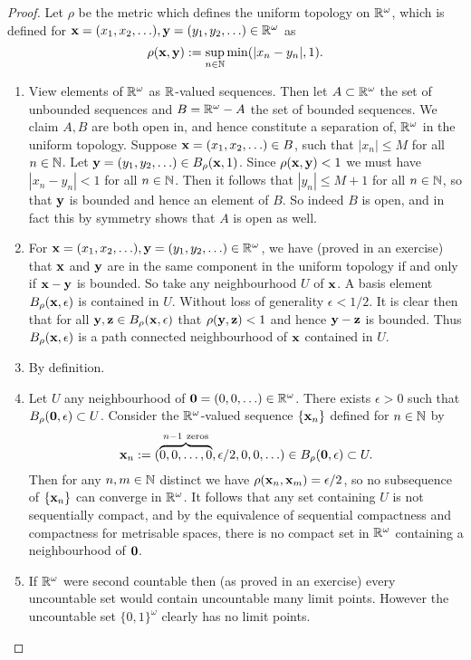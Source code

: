 \begin{proof}
  Let $\rho$ be the metric which defines the uniform topology on $\mathbb{R}^\omega$, which is defined for $\boldsymbol{\mathbf{x}} = (x_1,x_2,\ldots), \boldsymbol{\mathbf{y}} = (y_1,y_2,\ldots) \in \mathbb{R}^\omega$ as
\[ \rho(\boldsymbol{\mathbf{x}}, \boldsymbol{\mathbf{y}}) := \sup_{n \in \mathbb{N}} \min(|x_n - y_n|, 1). \]
  \begin{enumerate}[leftmargin=*]
  \item View elements of $\mathbb{R}^\omega$ as $\mathbb{R}$-valued sequences. Then let $A \subset \mathbb{R}^\omega$ the set of unbounded sequences and $B = \mathbb{R}^\omega - A$ the set of bounded sequences. We claim $A,B$ are both open in, and hence constitute a separation of, $\mathbb{R}^\omega$ in the uniform topology. Suppose $\boldsymbol{\mathbf{x}} = (x_1,x_2,\ldots) \in B$, such that $|x_n| \le M$ for all $n \in \mathbb{N}$. Let $\boldsymbol{\mathbf{y}} = (y_1, y_2, \ldots) \in B_\rho(\boldsymbol{\mathbf{x}}, 1)$. Since $\rho(\boldsymbol{\mathbf{x}}, \boldsymbol{\mathbf{y}}) < 1$ we must have $|x_n - y_n| < 1$ for all $n \in \mathbb{N}$. Then it follows that $|y_n| \le M+1$ for all $n \in \mathbb{N}$, so that $\boldsymbol{\mathbf{y}}$ is bounded and hence an element of $B$. So indeed $B$ is open, and in fact this by symmetry shows that $A$ is open as well.
  \item For $\boldsymbol{\mathbf{x}} = (x_1, x_2, \ldots), \boldsymbol{\mathbf{y}} = (y_1,y_2,\ldots) \in \mathbb{R}^\omega$, we have (proved in an exercise) that $\boldsymbol{\mathbf{x}}$ and $\boldsymbol{\mathbf{y}}$ are in the same component in the uniform topology if and only if $\boldsymbol{\mathbf{x}} - \boldsymbol{\mathbf{y}}$ is bounded. So take any neighbourhood $U$ of $\boldsymbol{\mathbf{x}}$. A basis element $B_\rho(\boldsymbol{\mathbf{x}}, \epsilon)$ is contained in $U$. Without loss of generality $\epsilon < 1/2$. It is clear then that for all $\boldsymbol{\mathbf{y}}, \boldsymbol{\mathbf{z}} \in B_\rho(\boldsymbol{\mathbf{x}}, \epsilon)$ that $\rho(\boldsymbol{\mathbf{y}}, \boldsymbol{\mathbf{z}}) < 1$ and hence $\boldsymbol{\mathbf{y}} - \boldsymbol{\mathbf{z}}$ is bounded. Thus $B_\rho(\boldsymbol{\mathbf{x}}, \epsilon)$ is a path connected neighbourhood of $\boldsymbol{\mathbf{x}}$ contained in $U$.
  \item By definition.
  \item Let $U$ any neighbourhood of $\boldsymbol{\mathbf{0}} = (0, 0, \ldots) \in \mathbb{R}^\omega$. There exists $\epsilon > 0$ such that $B_\rho(\boldsymbol{\mathbf{0}}, \epsilon) \subset U$. Consider the $\mathbb{R}^\omega$-valued sequence $\{\boldsymbol{\mathbf{x}}_n\}$ defined for $n \in \mathbb{N}$ by
\[ \boldsymbol{\mathbf{x}}_n := (\overbrace{0, 0, \ldots, 0}^{n-1\ \text{zeros}}, \epsilon/2, 0, 0, \ldots) \in  B_\rho(\boldsymbol{\mathbf{0}}, \epsilon) \subset U. \]
Then for any $n, m \in \mathbb{N}$ distinct we have $\rho(\boldsymbol{\mathbf{x}}_n, \boldsymbol{\mathbf{x}}_m) = \epsilon/2$, so no subsequence of $\{\boldsymbol{\mathbf{x}}_n\}$ can converge in $\mathbb{R}^\omega$. It follows that any set containing $U$ is not sequentially compact, and by the equivalence of sequential compactness and compactness for metrisable spaces, there is no compact set in $\mathbb{R}^\omega$ containing a neighbourhood of $\boldsymbol{\mathbf{0}}$. 
  \item If $\mathbb{R}^\omega$ were second countable then (as proved in an exercise) every uncountable set would contain uncountable many limit points. However the uncountable set $\{0,1\}^\omega$ clearly has no limit points. \qedhere
  \end{enumerate}
\end{proof}

